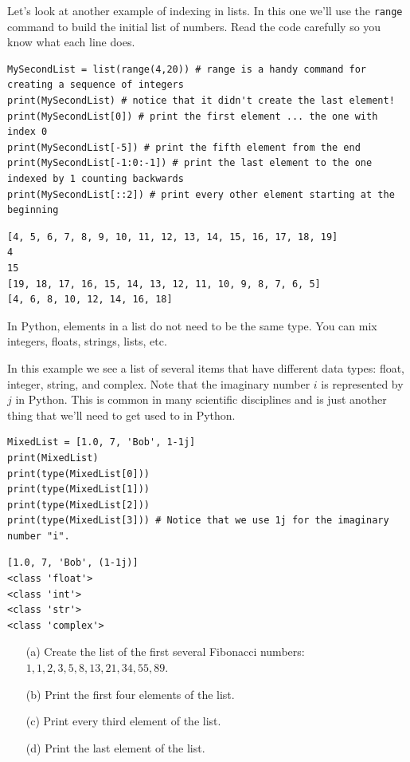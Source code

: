 \begin{example}
    Let's look at another example of indexing in lists.  In this one we'll use the
    \texttt{range} command to build the initial list of numbers.  Read the code carefully
    so you know what each line does.

    \bcode
\begin{lstlisting}
MySecondList = list(range(4,20)) # range is a handy command for creating a sequence of integers
print(MySecondList) # notice that it didn't create the last element!
print(MySecondList[0]) # print the first element ... the one with index 0
print(MySecondList[-5]) # print the fifth element from the end
print(MySecondList[-1:0:-1]) # print the last element to the one indexed by 1 counting backwards
print(MySecondList[::2]) # print every other element starting at the beginning
\end{lstlisting}
\boutput
\begin{lstlisting}
[4, 5, 6, 7, 8, 9, 10, 11, 12, 13, 14, 15, 16, 17, 18, 19]
4
15
[19, 18, 17, 16, 15, 14, 13, 12, 11, 10, 9, 8, 7, 6, 5]
[4, 6, 8, 10, 12, 14, 16, 18]
\end{lstlisting}
\end{example}

In Python, elements in a list do not need to be the same type. You can mix integers,
floats, strings, lists, etc.
\begin{example}
    In this example we see a list of several items that have different data types: float,
    integer, string, and complex.  Note that the imaginary number $i$ is represented by
    $j$ in Python.  This is common in many scientific disciplines and is just another
    thing that we'll need to get used to in Python.

    \bcode
\begin{lstlisting}
MixedList = [1.0, 7, 'Bob', 1-1j]
print(MixedList)
print(type(MixedList[0]))
print(type(MixedList[1]))
print(type(MixedList[2]))
print(type(MixedList[3])) # Notice that we use 1j for the imaginary number "i".
\end{lstlisting}
\boutput
\begin{lstlisting}
[1.0, 7, 'Bob', (1-1j)]
<class 'float'>
<class 'int'>
<class 'str'>
<class 'complex'>
\end{lstlisting}
\end{example}

\begin{problem}
    \begin{enumerate}
        \item[(a)] Create the list of the first several Fibonacci numbers:\\
            $1, 1, 2, 3, 5, 8, 13, 21, 34, 55, 89$.
        \item[(b)] Print the first four elements of the list.
        \item[(c)] Print every third element of the list.
        \item[(d)] Print the last element of the list.
    \end{enumerate}
\end{problem}

